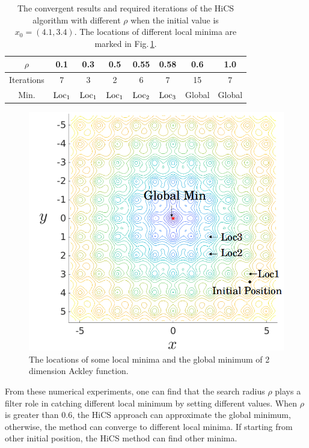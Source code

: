 \documentclass[final,1p,times]{elsarticle}
\begin{document}
\begin{table}[!htbp]
\caption{\label{tab:ackley:r}The convergent results and required
iterations of the HiCS algorithm with different
$\rho$ when the
initial value is $x_0=(4.1, 3.4)$. The locations of
different local minima are marked in Fig.\,\ref{fig:ackley:LG}.}
\begin{center}
\begin{tabular}{|c|c|c|c|c|c|c|c|}
 \hline
 $\rho$ & 0.1 & 0.3 & 0.5 & 0.55 & 0.58 &  0.6 & 1.0
 \\\hline
 Iterations & 7   & 3   &  2  & 6 & 7 & 15 & 7
 \\\hline
 Min. & $\rm{Loc_1}$ & $\rm{Loc_1}$ & $\rm{Loc_1}$ & $\rm{Loc_2}$
	& $\rm{Loc_3}$ & Global & Global
 \\\hline
\end{tabular}
\end{center}
\end{table}
\begin{figure}[!htbp]
	\centering
	  \includegraphics[scale=0.28]{../figures/ackley_LG.png}
	  \caption{The locations of some local minima and the global
	  minimum of 2 dimension Ackley function.}
\label{fig:ackley:LG}
\end{figure}
From these numerical experiments, one can find that the search
radius $\rho$ plays a filter role in
catching different local minimum by setting different values. 
When $\rho$ is greater than $0.6$, the HiCS
approach can approximate the global minimum, otherwise, the
method can converge to different local minima. If starting from other
initial position, the HiCS method can find other minima.
\end{document}
